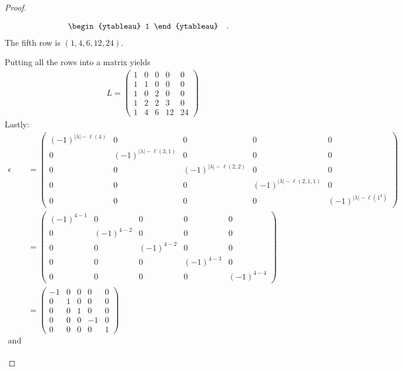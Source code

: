 \documentclass[12pt]{extarticle}
\newcommand{\abs}[1]{|#1|}
\newcommand{\<}{\langle}
\renewcommand{\>}{\rangle}
\theoremstyle{definition}
\begin{document}
\begin{proof}
\begin{enumerate}
\begin{itemize}
\begin{align*}
\begin{ytableau}
          1
        \end{ytableau}\quad.\quad
      \end{align*}
      The fifth row is $(1,4,6,12,24)$.
    \end{itemize}
    Putting all the rows into a matrix yields
    \begin{align*}
      L = 
      \begin{pmatrix}
        1 & 0 & 0 & 0 & 0 \\
        1 & 1 & 0 & 0 & 0 \\
        1 & 0 & 2 & 0 & 0 \\
        1 & 2 & 2 & 3 & 0 \\
        1 & 4 & 6 & 12 & 24
      \end{pmatrix}
    \end{align*}
    Lastly:
    \begin{align*}
      \epsilon
      &= 
      \begin{pmatrix}
        (-1)^{\abs{\lambda}- \ell(4)} & 0 & 0 & 0 & 0 \\
        0 & (-1)^{\abs{\lambda}-\ell(3,1)} & 0 & 0 & 0 \\
        0 & 0 & (-1)^{\abs{\lambda}-\ell(2,2)} & 0 & 0 \\
        0 & 0 & 0 & (-1)^{\abs{\lambda}-\ell(2,1,1)} & 0 \\
        0 & 0 & 0 & 0 & (-1)^{\abs{\lambda}-\ell(1^4)} 
      \end{pmatrix} \\
      &=
      \begin{pmatrix}
        (-1)^{4- 1} & 0 & 0 & 0 & 0 \\
        0 & (-1)^{4-2} & 0 & 0 & 0 \\
        0 & 0 & (-1)^{4-2} & 0 & 0 \\
        0 & 0 & 0 & (-1)^{4-3} & 0 \\
        0 & 0 & 0 & 0 & (-1)^{4-4} 
      \end{pmatrix} \\
      &=
      \begin{pmatrix}
        -1 & 0 & 0 & 0 & 0 \\
        0 & 1 & 0 & 0 & 0 \\
        0 & 0 & 1 & 0 & 0 \\
        0 & 0 & 0 & -1 & 0 \\
        0 & 0 & 0 & 0 & 1
      \end{pmatrix} \\
      \text{and}
      \\

\end{align*}
\end{enumerate}
\end{proof}
\end{document}

